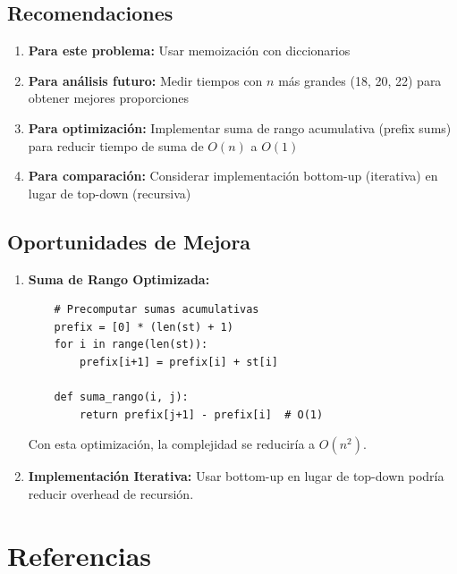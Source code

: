 \documentclass[12pt,letterpaper]{article}
\begin{document}
\subsection{Recomendaciones}

\begin{enumerate}
    \item \textbf{Para este problema:} Usar memoización con diccionarios
    \item \textbf{Para análisis futuro:} Medir tiempos con $n$ más grandes (18, 20, 22) para obtener mejores proporciones
    \item \textbf{Para optimización:} Implementar suma de rango acumulativa (prefix sums) para reducir tiempo de suma de $O(n)$ a $O(1)$
    \item \textbf{Para comparación:} Considerar implementación bottom-up (iterativa) en lugar de top-down (recursiva)
\end{enumerate}

\subsection{Oportunidades de Mejora}

\begin{enumerate}
    \item \textbf{Suma de Rango Optimizada:}
    \begin{lstlisting}
    # Precomputar sumas acumulativas
    prefix = [0] * (len(st) + 1)
    for i in range(len(st)):
        prefix[i+1] = prefix[i] + st[i]
    
    def suma_rango(i, j):
        return prefix[j+1] - prefix[i]  # O(1)
    \end{lstlisting}
    
    Con esta optimización, la complejidad se reduciría a $O(n^2)$.
    
    \item \textbf{Implementación Iterativa:} Usar bottom-up en lugar de top-down podría reducir overhead de recursión.
\end{enumerate}

\section{Referencias}
\end{document}
